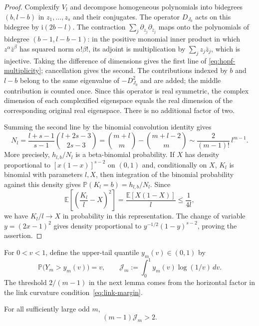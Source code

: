 \begin{proof}
Complexify $V_l$ and decompose homogeneous polynomials into bidegrees
$(b,l-b)$ in $z_1,\ldots,z_s$ and their conjugates.
The operator $D_{J_0}$ acts on this bidegree by $\mathrm i(2b-l)$.
The contraction $\sum_j\partial_{z_j}\partial_{\bar z_j}$ maps onto
the polynomials of bidegree $(b-1,l-b-1)$: in the positive monomial
inner product in which $z^\alpha\bar z^\beta$ has squared norm
$\alpha!\beta!$, its adjoint is multiplication by
$\sum_j z_j\bar z_j$, which is injective.
Taking the difference of dimensions gives the first line of
\eqref{eq:hopf-multiplicity}; cancellation gives the second.
The contributions indexed by \(b\) and \(l-b\) belong to the same
eigenvalue of \(-D_{J_0}^2\) and are added; the middle contribution is counted
once. Since this operator is real symmetric, the complex dimension of each
complexified eigenspace equals the real dimension of the corresponding
original real eigenspace. There is no additional
factor of two.

Summing the second line by the binomial convolution identity gives
\begin{equation}\label{eq:harmonic-multiplicity-asymptotic}
 N_l=\frac{l+s-1}{s-1}\binom{l+2s-3}{2s-3}
 =\binom{m+l}{m}-\binom{m+l-2}{m}
 \sim\frac{2}{(m-1)!}\,l^{m-1}.
\end{equation}
More precisely, $h_{l,b}/N_l$ is a beta-binomial probability.
If $X$ has density proportional to $[x(1-x)]^{s-2}$ on $(0,1)$ and,
conditionally on $X$, $K_l$ is binomial with parameters $l,X$, then
integration of the binomial probability against this density gives
$\mathbb P(K_l=b)=h_{l,b}/N_l$.
Since
\[
 \mathbb E\left[\left(\frac{K_l}{l}-X\right)^2\right]
 =\frac{\mathbb E[X(1-X)]}{l}\le\frac{1}{4l},
\]
we have $K_l/l\to X$ in probability in this representation.
The change of variable $y=(2x-1)^2$ gives density proportional to
$y^{-1/2}(1-y)^{s-2}$, proving the assertion.
\end{proof}

For $0<v<1$, define the upper-tail quantile $y_m(v)\in(0,1)$ by
\[
 \mathbb P\bigl(Y_m>y_m(v)\bigr)=v,
 \qquad
 \mathcal J_m:=\int_0^1 y_m(v)\log(1/v)\,dv.
\]
The threshold $2/(m-1)$ in the next lemma comes from the horizontal
factor in the link curvature condition~\eqref{eq:link-margin}.

\begin{lemma}\label{lem:weighted-quantile}
For all sufficiently large odd $m$,
\begin{equation}\label{eq:weighted-quantile-gap}
 (m-1)\mathcal J_m>2.
\end{equation}
\end{lemma}

